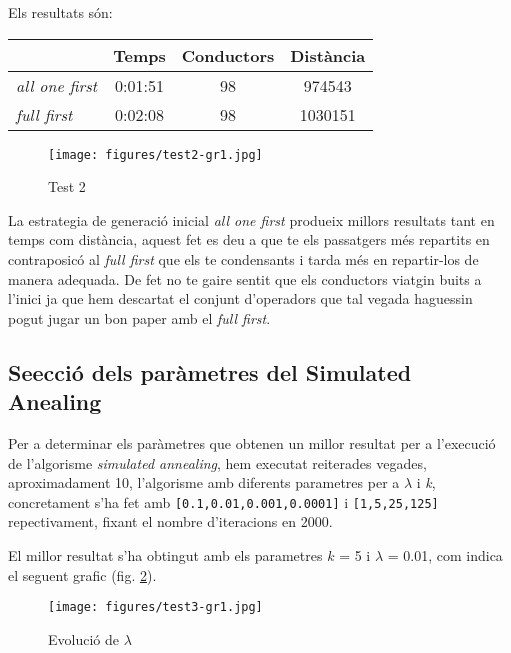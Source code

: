 Els resultats són:


\begin{center}
\begin{tabular}{l|ccc}
         & Temps & Conductors & Distància\\
\hline
\emph{all one first} & 0:01:51 & 98 & 974543  \\
\emph{full first} & 0:02:08 & 98 & 1030151 
\end{tabular}
\end{center}

\begin{figure}[H]
\begin{center}
 \texttt{[image: figures/test2-gr1.jpg]}
 \label{test2-gr1}
\caption{Test 2}
\end{center}
\end{figure}
                                                                                                                                                                                  
La estrategia de generació inicial \emph{all one first} produeix millors resultats tant en temps com distància,
aquest fet es deu a que te els passatgers més repartits en contraposicó al \emph{full first} que els te
condensants i tarda més en repartir-los de manera adequada. De fet no te gaire sentit que els conductors
viatgin buits a l'inici ja que hem descartat el conjunt d'operadors que tal vegada haguessin pogut
jugar un bon paper amb el \emph{full first}.

\subsection{Se\lgem ecció dels paràmetres del Simulated Anealing}
Per a determinar els paràmetres que obtenen un millor resultat per a l'execució de l'algorisme \emph{simulated annealing},
hem executat reiterades vegades, aproximadament 10, l'algorisme amb diferents parametres per a $\lambda$ i \emph{k}, concretament s'ha fet amb
\texttt{[0.1,0.01,0.001,0.0001]} i \texttt{[1,5,25,125]} repectivament, fixant el nombre d'iteracions en 2000.

El millor resultat s'ha obtingut amb els parametres $k$ = 5 i $\lambda$ = 0.01, com indica el seguent grafic (fig. \ref{test3-gr1}).

\begin{figure}[H]
\begin{center} 
 \texttt{[image: figures/test3-gr1.jpg]}
\label{test3-gr1}
\caption{Evolució de $\lambda$}
\end{center}
\end{figure}

